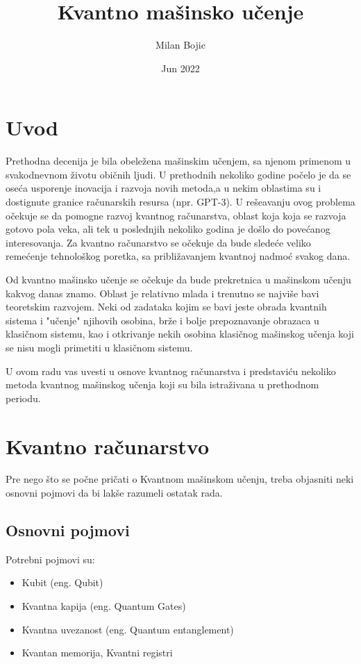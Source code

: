 \documentclass[12pt, letterpaper, oneside]{article}
\title{Kvantno mašinsko učenje}
\author{Milan Bojic}
\date{Jun 2022}
\begin{document}
\maketitle
\newpage

\tableofcontents
\newpage
\section{Uvod}
Prethodna decenija je bila obeležena mašinskim učenjem, sa njenom primenom u svakodnevnom životu običnih ljudi.
U prethodnih nekoliko godine počelo je da se oseća usporenje inovacija i razvoja novih metoda,a u nekim oblastima su i dostignute granice računarskih resursa (npr. GPT-3).
U rešeavanju ovog problema očekuje se da pomogne razvoj kvantnog računarstva, oblast koja koja se razvoja gotovo pola veka, ali tek u poslednjih nekoliko godina je došlo do
povećanog interesovanja. Za kvantno računarstvo se očekuje da bude sledeće veliko remećenje tehnološkog poretka, sa približavanjem kvantnoj nadmoć svakog dana.

Od kvantno mašinsko učenje se očekuje da bude prekretnica u mašinskom učenju kakvog danas znamo. Oblast je relativno mlada i trenutno se najviše bavi teoretskim razvojem.
Neki od zadataka kojim se bavi jeste obrada kvantnih sistema i "učenje" njihovih osobina, brže i bolje prepoznavanje obrazaca u klasičnom sistemu, kao i
otkrivanje nekih osobina klasičnog mašinskog učenja koji se nisu mogli primetiti u klasičnom sistemu.

U ovom radu vas uvesti u osnove kvantnog računarstva i predstaviću nekoliko metoda kvantnog mašinskog učenja koji su bila istraživana u prethodnom periodu. 
\section{Kvantno računarstvo}
Pre nego što se počne pričati o Kvantnom mašinskom učenju, treba objasniti neki osnovni pojmovi da bi lakše razumeli ostatak rada.

\subsection{Osnovni pojmovi}
Potrebni pojmovi su:
\begin{itemize}
    \item Kubit (eng. Qubit)
    \item Kvantna kapija (eng. Quantum Gates)
    \item Kvantna uvezanost (eng. Quantum entanglement)
    \item Kvantan memorija, Kvantni registri
\end{itemize}
\end{document}
